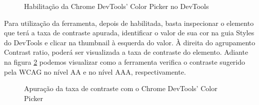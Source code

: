 \documentclass[
	12pt,				%
	openright,			%
	oneside,			%
	a4paper,			%
	chapter=TITLE,		%
	section=TITLE,		%
	subsection=TITLE,	%
	subsubsection=TITLE,%
	english,			%
	brazil				%
	]{abntex2}
\theoremstyle{definition}
\begin{document}
\begin{itemize}
\begin{figure}[!h]
\centering
\caption{Habilitação da Chrome DevTools’ Color Picker no DevTools}
\label{Habilitação da Chrome DevTools’ Color Picker no DevTools}
\end{figure}

\pagebreak

Para utilização da ferramenta, depois de habilitada, basta inspecionar o elemento que terá a taxa de contraste apurada, identificar o valor de sua cor na guia Styles do DevTools e clicar na thumbnail à esquerda do valor. À direita do agrupamento Contrast ratio, poderá ser visualizada a taxa de contraste do elemento. Adiante na figura \ref{Apuração da taxa de contraste com o Chrome DevTools’ Color Picker } podemos visualizar como a ferramenta verifica o contraste sugerido pela WCAG no nível AA e no nível AAA, respectivamente.

\begin{figure}[!h]
\centering
\caption{Apuração da taxa de contraste com o Chrome DevTools’ Color Picker }
\label{Apuração da taxa de contraste com o Chrome DevTools’ Color Picker }
\end{figure}


\end{itemize}
\end{document}
